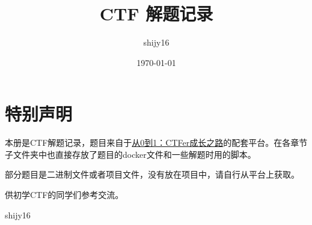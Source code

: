 \documentclass[cn,11pt,chinese]{elegantbook}
\title{CTF 解题记录}
\author{shijy16}
\date{\today}
\begin{document}
\maketitle

\chapter*{特别声明}

本册是CTF解题记录，题目来自于\href{https://book.nu1l.com/}{从0到1：CTFer成长之路}的配套平台。在各章节子文件夹中也直接存放了题目的docker文件和一些解题时用的脚本。

部分题目是二进制文件或者项目文件，没有放在项目中，请自行从平台上获取。

供初学CTF的同学们参考交流。

\vskip 1.5cm

\begin{flushright}
shijy16
\end{flushright}


\tableofcontents
\setcounter{page}{1}



\end{document}
